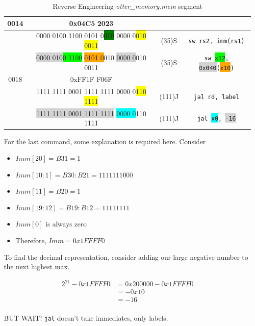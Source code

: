 \documentclass[a4paper]{report}
\begin{document}
\begin{table}[H]
\begin{tabular}{||c|c|c|c||}
						0014 & \tiny{0x04C5 2023} & & \\ \hline
							 & \tiny{0000 0100 1100 0101 0\colorbox{green}{010} 0000 0\colorbox{yellow}{010 0011}} & (35)S & \texttt{sw rs2, imm(rs1)}\\ \hline
							 & \tiny{\colorbox{lightgray}{0000 010}\colorbox{lime}{0 1100} \colorbox{orange}{0101 0}010 \colorbox{lightgray}{0000 0}010 0011} & (35)S &  \texttt{sw \colorbox{lime}{x12}, \colorbox{lightgray}{0x040}(\colorbox{orange}{x10})}\\ \hline

						0018 & \tiny{0xFF1F F06F} & & \\ \hline
							 & \tiny{1111 1111 0001 1111 1111 0000 0\colorbox{yellow}{110 1111}} & (111)J & \texttt{jal rd, label}\\ \hline
							 & \tiny{\colorbox{lightgray}{1111 1111 0001 1111 1111} \colorbox{cyan}{0000 0}110 1111} & (111)J & \texttt{jal \colorbox{cyan}{x0}, \colorbox{lightgray}{-16}}\\ \hline

					\end{tabular}
					\caption{Reverse Engineering \textit{otter\_memory.mem} segment}
					\label{tab:hw_a1_reverseTable}
				\end{table}

				For the last command, some explanation is required here. 
				Consider
				\begin{itemize}
					\item $Imm[20] = B31 = 1$
					\item $Imm[10:1] = B30:B21 = 1111 111 000$
					\item $Imm[11] = B20 = 1$
					\item $Imm[19:12] = B19:B12 = 1111 1111$
					\item $Imm[0]$ is always zero
					\item Therefore,  $Imm = 0x1FFFF0$
				\end{itemize}

				To find the decimal representation, consider adding our
				large negative number to the next highest max. 

				\begin{align*}
					2^{21} - 0x1FFFF0 &= 0x200000 - 0x1FFFF0 \\
					&= -0x10 \\
					&= -16 \\
				\end{align*}	


				BUT WAIT! \texttt{jal} doesn't take immediates, only labels.
\end{document}

